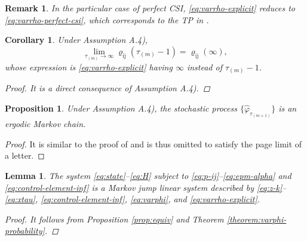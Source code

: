 \documentclass[journal,twoside,web]{ieeecolor}
\newtheorem{corollary}{Corollary}[theorem]
\newtheorem{remark}{Remark}
\newtheorem{lemma}{Lemma}
\newtheorem{proposition}{Proposition}
\begin{document}
\begin{remark}\label{rem:automatica-2}
    In the particular case of perfect CSI, \eqref{eq:varrho-explicit} reduces to \eqref{eq:varrho-perfect-csi}, which corresponds to the TP in \cite[Eq. (30)]{yZL-2025-automatica}.
\end{remark}

\begin{corollary}\label{corollary:varrho-inf}
    Under Assumption A.4), 
\begin{equation}
    \lim_{\tau_{(m)}\to \infty} \varrho_{\mathrm{i}\mathrm{j}}(\tau_{(m)}-1) = \varrho_{\mathrm{i}\mathrm{j}}(\infty),
\end{equation}
whose expression is \eqref{eq:varrho-explicit} having $\infty$ instead of $\tau_{(m)}-1$.

\begin{proof}
    It is a direct consequence of Assumption A.4).
\end{proof}
\end{corollary}

\begin{proposition}\label{prop:ergodicity}
	Under Assumption A.4), the stochastic process $\{\hat{\varphi}_{\tau_{(m+1)}}\}$ is an ergodic Markov chain.
\end{proposition}
\begin{proof}
    It is similar to the proof of \cite[Prop. 15]{yZL-2025-automatica} and is thus omitted to satisfy the page limit of a letter. 
\end{proof}
\begin{lemma}\label{lemma:mjls-stability}
    The system \eqref{eq:state}--\eqref{eq:H} subject to \eqref{eq:p-ij}--\eqref{eq:epm-alpha} and \eqref{eq:control-element-inf} is a Markov jump linear system %
    described by \eqref{eq:z-k}--\eqref{eq:xtau}, \eqref{eq:control-element-inf}, \eqref{eq:varphi}, and \eqref{eq:varrho-explicit}.

\begin{proof}
    It follows from Proposition \ref{prop:equiv} %
    and Theorem \ref{theorem:varphi-probability}.
\end{proof}
\end{lemma}
\end{document}

